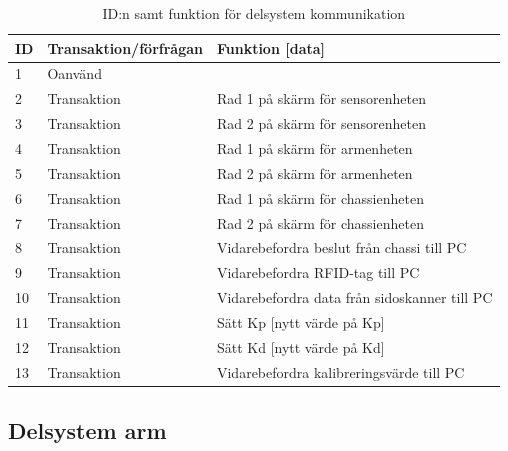 \begin{table}[H]
\centering
\label{callbacks-komm}
\begin{tabularx}{\textwidth}{|l|l|X|}
\hline
\textbf{ID} & \textbf{Transaktion/förfrågan} & \textbf{Funktion [data]} \\ \hline
1 & Oanvänd & \\ \hline
2 & Transaktion & Rad 1 på skärm för sensorenheten \\ \hline
3 & Transaktion & Rad 2 på skärm för sensorenheten \\ \hline
4 & Transaktion & Rad 1 på skärm för armenheten \\ \hline
5 & Transaktion & Rad 2 på skärm för armenheten \\ \hline
6 & Transaktion & Rad 1 på skärm för chassienheten \\ \hline
7 & Transaktion & Rad 2 på skärm för chassienheten \\ \hline
8 & Transaktion & Vidarebefordra beslut från chassi till PC \\ \hline
9 & Transaktion & Vidarebefordra RFID-tag till PC\\ \hline
10 & Transaktion & Vidarebefordra data från sidoskanner till PC \\ \hline
11 & Transaktion & Sätt Kp [nytt värde på Kp] \\ \hline
12 & Transaktion & Sätt Kd [nytt värde på Kd] \\ \hline
13 & Transaktion & Vidarebefordra kalibreringsvärde till PC \\ \hline
\end{tabularx}
\caption{ID:n samt funktion för delsystem kommunikation}
\end{table}

\subsection{Delsystem arm}

